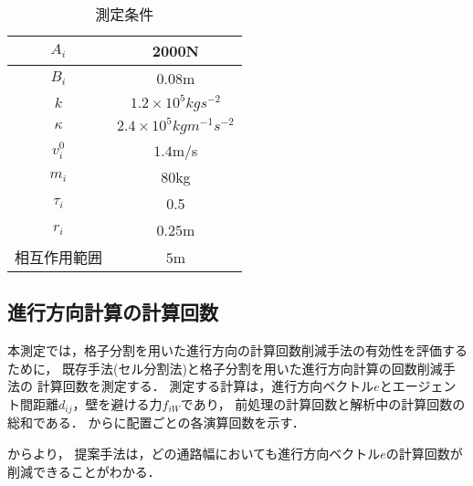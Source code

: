 \begin{table}[t]
  \begin{center}
    \caption{測定条件}
    \label{tb:result_para}
    \begin{tabular}{c|c}
      \hline \hline
      $A_i$            & 2000N                              \\ \hline 
      $B_i$            & 0.08m                              \\ \hline 
      $k$              & $1.2 \times 10^5 kg s^{-2} $       \\ \hline 
      $\kappa$         & $2.4 \times 10^5 kg m^{-1} s^{-2}$ \\ \hline 
      $v_i^0$          & $1.4$m/s                           \\ \hline 
      $m_i$            & $80$kg                             \\ \hline 
      $\tau_i$         & 0.5                               \\ \hline 
      $r_i$            & $0.25$m                            \\ \hline 
      相互作用範囲     & $5$m                              \\ \hline 
    \end{tabular}
  \end{center}
\end{table}

\subsection{進行方向計算の計算回数}
本測定では，格子分割を用いた進行方向の計算回数削減手法の有効性を評価するために，
既存手法(セル分割法)と格子分割を用いた進行方向計算の回数削減手法の
計算回数を測定する．
測定する計算は，進行方向ベクトル$e$とエージェント間距離$d_{ij}$，壁を避ける力$f_{iW}$であり，
前処理の計算回数と解析中の計算回数の総和である．
からに配置ごとの各演算回数を示す．

からより，
提案手法は，どの通路幅においても進行方向ベクトル$e$の計算回数が削減できることがわかる．




